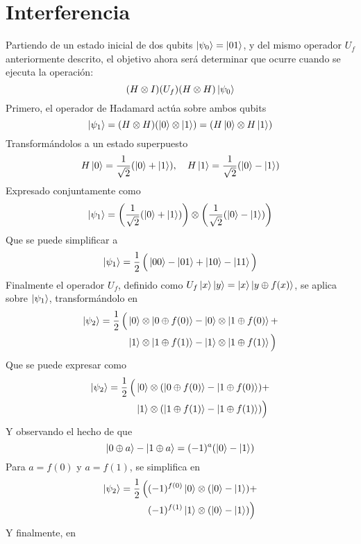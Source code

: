 \section{Interferencia}

Partiendo de un estado inicial de dos qubits $\ket{\psi_{0}} = \ket{01}$, y del mismo 
operador $U_f$ anteriormente descrito, el objetivo ahora será determinar que 
ocurre cuando se ejecuta la operación:
$$ (H \otimes I)(U_f)(H \otimes H)\ket{\psi_{0}} $$
Primero, el operador de Hadamard actúa sobre ambos qubits
$$ \ket{\psi_{1}} = (H \otimes H)(\ket{0} \otimes \ket{1}) =
(H \ket{0} \otimes H \ket{1})$$
Transformándolos a un estado superpuesto
$$H \ket 0 = \frac{1}{\sqrt 2}(\ket 0 + \ket 1), \quad
H \ket 1 = \frac{1}{\sqrt 2}(\ket 0 - \ket 1)$$
Expresado conjuntamente como
$$ \ket{\psi_{1}} = \left( \frac{1}{\sqrt 2}(\ket 0 + \ket 1) \right)
\otimes \left( \frac{1}{\sqrt 2}(\ket 0 - \ket 1) \right) $$
Que se puede simplificar a
$$ \ket{\psi_{1}} = \frac{1}{2} \, \Big( \ket{00} - \ket{01} + \ket{10} - \ket{11} \Big) 
$$
Finalmente el operador $U_f$, definido como $ U_f \ket{x}\ket{y} = \ket{x}\ket{y 
\oplus f(x)}$, se aplica sobre $\ket{\psi_{1}}$, transformándolo en
\begin{equation*}
\begin{split}
\ket{\psi_{2}} = \frac{1}{2} \, \Big(
&\ket{0}\otimes\ket{0 \oplus f(0)} - \ket{0}\otimes\ket{1 \oplus f(0)} + \\
&\ket{1}\otimes\ket{1 \oplus f(1)} - \ket{1}\otimes\ket{1 \oplus f(1)} \Big)
\end{split}
\end{equation*}
Que se puede expresar como
\begin{equation*}
\begin{split}
\ket{\psi_{2}} = \frac{1}{2} \, \Big(
& \ket{0} \otimes ( \ket{0 \oplus f(0)} - \ket{1 \oplus f(0)}) + \\
& \ket{1} \otimes ( \ket{1 \oplus f(1)} - \ket{1 \oplus f(1)}) \Big)
\end{split}
\end{equation*}
Y observando el hecho de que
$$ \ket{0 \oplus a} - \ket{1 \oplus a} = (-1)^a (\ket 0 - \ket 1) $$
Para $a = f(0)$ y $a = f(1)$, se simplifica en
\begin{equation*}
\begin{split}
\ket{\psi_{2}} = \frac{1}{2} \, \Big(
& (-1)^{f(0)} \ket{0} \otimes (\ket 0 - \ket 1) + \\
& (-1)^{f(1)} \ket{1} \otimes (\ket 0 - \ket 1) \Big)
\end{split}
\end{equation*}
Y finalmente, en
